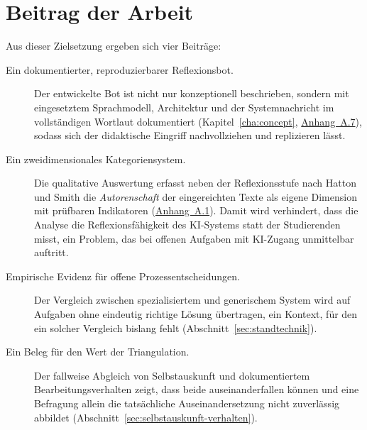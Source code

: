 \section{Beitrag der Arbeit}
\label{sec:beitrag}

Aus dieser Zielsetzung ergeben sich vier Beiträge:

\begin{description}
    \item[Ein dokumentierter, reproduzierbarer Reflexionsbot.] Der entwickelte Bot ist nicht nur
    konzeptionell beschrieben, sondern mit eingesetztem Sprachmodell, Architektur und der
    Systemnachricht im vollständigen Wortlaut dokumentiert (Kapitel~\ref{cha:concept},
    \hyperref[app:systemprompt]{Anhang~A.7}), sodass sich der didaktische Eingriff nachvollziehen und replizieren lässt.
    \item[Ein zweidimensionales Kategoriensystem.] Die qualitative Auswertung erfasst neben der
    Reflexionsstufe nach Hatton und Smith die \emph{Autorenschaft} der eingereichten Texte als eigene
    Dimension mit prüfbaren Indikatoren (\hyperref[app:kategoriensystem]{Anhang~A.1}). Damit wird verhindert, dass die Analyse die
    Reflexionsfähigkeit des KI-Systems statt der Studierenden misst, ein Problem, das bei offenen
    Aufgaben mit KI-Zugang unmittelbar auftritt.
    \item[Empirische Evidenz für offene Prozessentscheidungen.] Der Vergleich zwischen
    spezialisiertem und generischem System wird auf Aufgaben ohne eindeutig richtige Lösung
    übertragen, ein Kontext, für den ein solcher Vergleich bislang fehlt
    (Abschnitt~\ref{sec:standtechnik}).
    \item[Ein Beleg für den Wert der Triangulation.] Der fallweise Abgleich von Selbstauskunft und
    dokumentiertem Bearbeitungsverhalten zeigt, dass beide auseinanderfallen können und eine
    Befragung allein die tatsächliche Auseinandersetzung nicht zuverlässig abbildet
    (Abschnitt~\ref{sec:selbstauskunft-verhalten}).
\end{description}